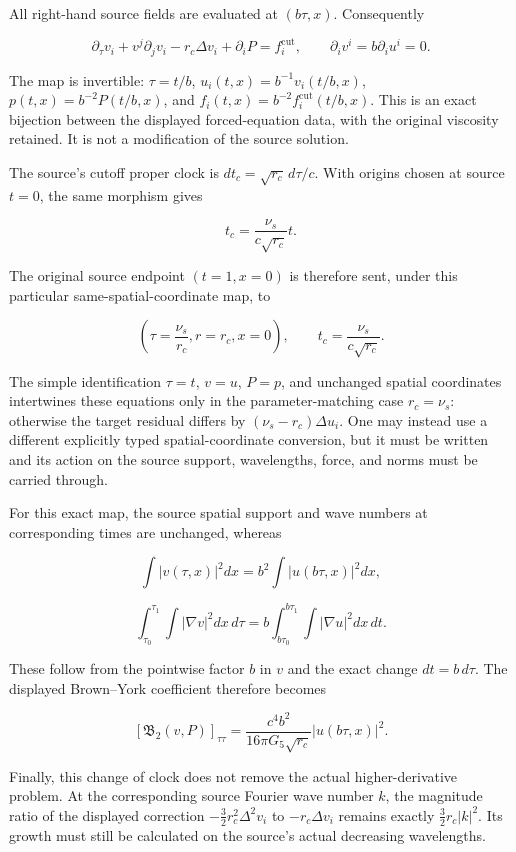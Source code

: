 \documentclass[10pt,a4paper,oneside]{report}
\begin{document}
All right-hand source fields are evaluated at \((b\tau,x)\).
Consequently

\[
\partial_\tau v_i+v^j\partial_jv_i-r_c\Delta v_i+\partial_iP
=f_i^{\mathrm{cut}},
\qquad \partial_iv^i=b\partial_iu^i=0.
\]

The map is invertible: \(\tau=t/b\), \(u_i(t,x)=b^{-1}v_i(t/b,x)\),
\(p(t,x)=b^{-2}P(t/b,x)\), and
\(f_i(t,x)=b^{-2}f_i^{\mathrm{cut}}(t/b,x)\). This is an exact bijection
between the displayed forced-equation data, with the original viscosity
retained. It is not a modification of the source solution.

The source's cutoff proper clock is \(dt_c=\sqrt{r_c}\,d\tau/c\). With
origins chosen at source \(t=0\), the same morphism gives

\[
t_c=\frac{\nu_s}{c\sqrt{r_c}}t.
\]

The original source endpoint \((t=1,x=0)\) is therefore sent, under this
particular same-spatial-coordinate map, to

\[
\left(\tau=\frac{\nu_s}{r_c},r=r_c,x=0\right),
\qquad t_c=\frac{\nu_s}{c\sqrt{r_c}}.
\]

The simple identification \(\tau=t\), \(v=u\), \(P=p\), and unchanged
spatial coordinates intertwines these equations only in the
parameter-matching case \(r_c=\nu_s\): otherwise the target residual
differs by \((\nu_s-r_c)\Delta u_i\). One may instead use a different
explicitly typed spatial-coordinate conversion, but it must be written
and its action on the source support, wavelengths, force, and norms must
be carried through.

For this exact map, the source spatial support and wave numbers at
corresponding times are unchanged, whereas

\[
\int |v(\tau,x)|^2dx=b^2\int|u(b\tau,x)|^2dx,
\]

\[
\int_{\tau_0}^{\tau_1}\int|\nabla v|^2dx\,d\tau
=b\int_{b\tau_0}^{b\tau_1}\int|\nabla u|^2dx\,dt.
\]

These follow from the pointwise factor \(b\) in \(v\) and the exact
change \(dt=b\,d\tau\). The displayed Brown--York coefficient therefore
becomes

\[
[\mathfrak B_2(v,P)]_{\tau\tau}
=\frac{c^4b^2}{16\pi G_5\sqrt{r_c}}|u(b\tau,x)|^2.
\]

Finally, this change of clock does not remove the actual
higher-derivative problem. At the corresponding source Fourier wave
number \(k\), the magnitude ratio of the displayed correction
\(-\tfrac32r_c^2\Delta^2v_i\) to \(-r_c\Delta v_i\) remains exactly
\(\tfrac32r_c|k|^2\). Its growth must still be calculated on the
source's actual decreasing wavelengths.
\end{document}
